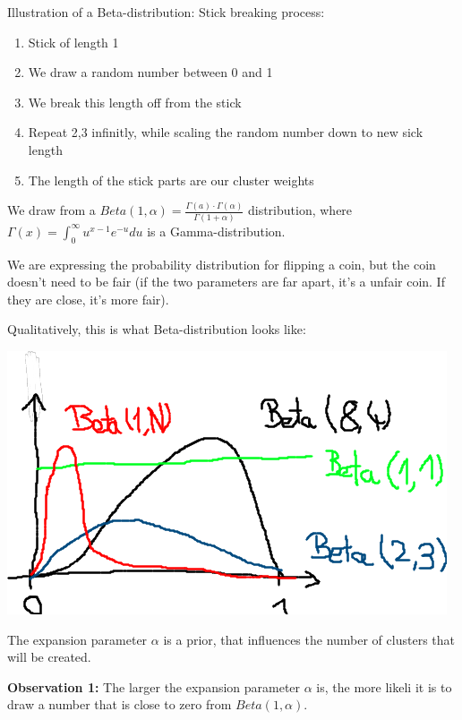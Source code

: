 \documentclass{scrartcl}
\begin{document}
\bigbreak

Illustration of a Beta-distribution: Stick breaking process:

\begin{enumerate}
    \item
        Stick of length 1 
    \item
        We draw a random number between 0 and 1
    \item
        We break this length off from the stick
    \item
        Repeat 2,3 infinitly, while scaling the random number down to new sick length
    \item
        The length of the stick parts are our cluster weights
\end{enumerate}

We draw from a \(Beta (1,\alpha) = \frac{\Gamma(a) \cdot \Gamma(\alpha)}{\Gamma(1+\alpha)}\) distribution, where \(\Gamma(x) = \int_0^{\infty} u^{x-1}e^{-u}du \) is a Gamma-distribution.

We are expressing the probability distribution for flipping a coin, but the coin doesn't need to be fair (if the two parameters are far apart, it's a unfair coin. If they are close, it's more fair).

Qualitatively, this is what Beta-distribution looks like:
\begin{center}
    \includegraphics[scale=0.7]{img/betadist.png}
\end{center}
The expansion parameter \(\alpha\) is a prior, that influences the number of clusters that will be created. 

\textbf{Observation 1:} The larger the expansion parameter \(\alpha\) is, the more likeli it is to draw a number that is close to zero from \(Beta(1,\alpha)\).
\end{document}
